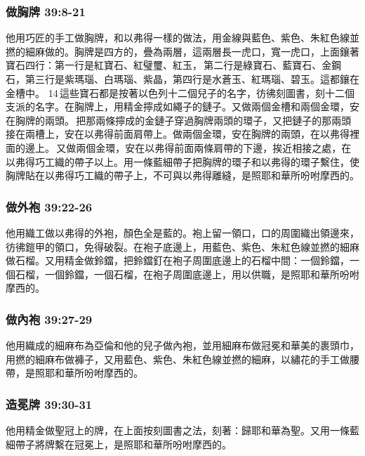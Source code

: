 \begin{table}
\subsubsection{做胸牌 39:8-21}
他用巧匠的手工做胸牌，和以弗得一樣的做法，用金線與藍色、紫色、朱紅色線並撚的細麻做的。胸牌是四方的，疊為兩層，這兩層長一虎口，寬一虎口，上面鑲著寶石四行：第一行是紅寶石、紅璧璽、紅玉， 第二行是綠寶石、藍寶石、金鋼石，第三行是紫瑪瑙、白瑪瑙、紫晶，第四行是水蒼玉、紅瑪瑙、碧玉。這都鑲在金槽中。 14 這些寶石都是按著以色列十二個兒子的名字，彷彿刻圖書，刻十二個支派的名字。在胸牌上，用精金擰成如繩子的鏈子。又做兩個金槽和兩個金環，安在胸牌的兩頭。 把那兩條擰成的金鏈子穿過胸牌兩頭的環子，又把鏈子的那兩頭接在兩槽上，安在以弗得前面肩帶上。做兩個金環，安在胸牌的兩頭，在以弗得裡面的邊上。 又做兩個金環，安在以弗得前面兩條肩帶的下邊，挨近相接之處，在以弗得巧工織的帶子以上。用一條藍細帶子把胸牌的環子和以弗得的環子繫住，使胸牌貼在以弗得巧工織的帶子上，不可與以弗得離縫，是照耶和華所吩咐摩西的。

\subsubsection{做外袍 39:22-26}
他用織工做以弗得的外袍，顏色全是藍的。袍上留一領口，口的周圍織出領邊來，彷彿鎧甲的領口，免得破裂。在袍子底邊上，用藍色、紫色、朱紅色線並撚的細麻做石榴。又用精金做鈴鐺，把鈴鐺釘在袍子周圍底邊上的石榴中間：一個鈴鐺，一個石榴，一個鈴鐺，一個石榴，在袍子周圍底邊上，用以供職，是照耶和華所吩咐摩西的。

\subsubsection{做內袍 39:27-29}
他用織成的細麻布為亞倫和他的兒子做內袍，並用細麻布做冠冕和華美的裹頭巾，用撚的細麻布做褲子，又用藍色、紫色、朱紅色線並撚的細麻，以繡花的手工做腰帶，是照耶和華所吩咐摩西的。

\subsubsection{造冕牌 39:30-31}
他用精金做聖冠上的牌，在上面按刻圖書之法，刻著：歸耶和華為聖。又用一條藍細帶子將牌繫在冠冕上，是照耶和華所吩咐摩西的。


\end{table}
